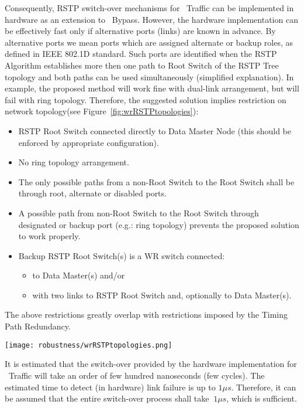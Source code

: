 Consequently, RSTP switch-over mechanisms for \HP\ Traffic can be
implemented in hardware as an extension to \HP\ Bypass. However, the hardware
implementation can be effectively fast only if alternative ports (links) are
known in advance. By alternative ports we mean ports which are assigned
alternate or backup roles, as defined in IEEE 802.1D standard\cite{IEEE8021D}.
Such ports are identified when the RSTP Algorithm establishes more then one path
to Root Switch of the RSTP Tree topology and both paths can be used
simultaneously (simplified explanation). In example, the proposed method will
work fine with dual-link arrangement, but will fail with ring topology.
Therefore, the suggested solution implies restriction on network topology(see
Figure~\ref{fig:wrRSTPtopologies}):
\begin{itemize}
  \item RSTP Root Switch connected directly to Data Master Node
(this should be enforced by appropriate configuration).
  \item No ring topology arrangement. 
  \item The only possible paths from a non-Root Switch to the Root Switch shall
be through root, alternate or disabled ports. 
  \item A possible path from non-Root Switch to the Root Switch through
designated or backup port (e.g.: ring topology) prevents the proposed solution
to work properly.
  \item Backup RSTP Root Switch(s) is a WR switch connected:
  \begin{itemize}
    \item to Data Master(s) and/or
    \item with two links to RSTP Root Switch and, optionally to Data
	  Master(s).
  \end{itemize} 
\end{itemize}
The above restrictions greatly overlap with restrictions imposed by the
Timing Path Redundancy.

\begin{center}
	\texttt{[image: robustness/wrRSTPtopologies.png]}
	\label{fig:wrRSTPtopologies}
\end{center}

It is estimated that the switch-over provided by the hardware implementation
for \HP\ Traffic will take an order of few hundred nanoseconds (few cycles). The
estimated time to detect (in hardware) link failure is up to $1\mu s$.
Therefore, it can be assumed that the entire switch-over process shall take
$~1\mu s$, which is sufficient. 

